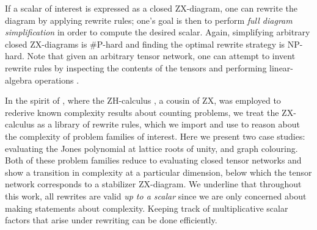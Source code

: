 If a scalar of interest is expressed as a closed ZX-diagram,
one can rewrite the diagram by applying rewrite rules; one's goal is then to perform \emph{full diagram simplification} in order to compute the desired scalar.
Again, simplifying arbitrary closed ZX-diagrams is \#P-hard and finding the optimal rewrite strategy is NP-hard.
Note that
given an arbitrary tensor network, one can attempt to invent rewrite rules by inspecting the contents of the tensors and performing linear-algebra operations \cite{gray2020hyperoptimized}.



In the spirit of \cite{debeaudrap2020tensor},
where the ZH-calculus \cite{backens2018zh}, a cousin of ZX, was employed to rederive known complexity results about counting problems, we treat the ZX-calculus as a library of rewrite rules, which we import and use to reason about the complexity of problem families of interest.
Here we present two case studies: evaluating the Jones polynomial at lattice roots of unity, and graph colouring.
Both of these problem families reduce to evaluating
closed tensor networks and show a transition in complexity
at a particular dimension, below which the tensor network corresponds to a stabilizer ZX-diagram.
We underline that throughout this work, all rewrites are valid
\emph{up to a scalar}
since we are only concerned about making statements about complexity.
Keeping track of multiplicative scalar factors that arise under rewriting can be done efficiently.
